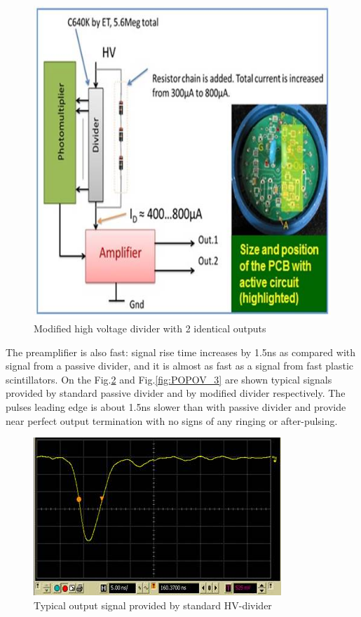 \begin{figure}[!ht]
    \centering
    \includegraphics[width=1.0\linewidth,trim={0.0cm 0.0cm 0.0cm 0.0cm},clip]{images/POPOV_1.jpg}
    \caption{Modified high voltage divider with 2 identical outputs}
    \label{fig:POPOV_1}
\end{figure}

The preamplifier is also fast: signal rise time increases by 1.5ns as compared with signal from a passive divider, and it is almost as fast as a signal from fast plastic scintillators. On the Fig.\ref{fig:POPOV_2} and Fig.\ref{fig:POPOV_3} are shown typical signals provided by standard passive divider and by modified divider respectively. The pulses leading edge is about 1.5ns slower than with passive divider and provide near perfect output termination with no signs of any ringing or after-pulsing.

\begin{figure}[!ht]
    \centering
    \includegraphics[width=1.0\linewidth,trim={0.0cm 0.0cm 0.0cm 0.0cm},clip]{images/POPOV_2.jpg}
    \caption{Typical output signal provided by standard HV-divider}
    \label{fig:POPOV_2}
\end{figure}

